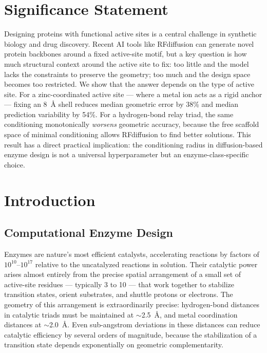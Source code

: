 \documentclass[11pt,letterpaper]{article}
\begin{document}
\section*{Significance Statement}
\begin{mdframed}
Designing proteins with functional active sites is a central challenge in synthetic biology and drug discovery. Recent AI tools like RFdiffusion can generate novel protein backbones around a fixed active-site motif, but a key question is how much structural context around the active site to fix: too little and the model lacks the constraints to preserve the geometry; too much and the design space becomes too restricted. We show that the answer depends on the type of active site. For a zinc-coordinated active site — where a metal ion acts as a rigid anchor — fixing an 8~\AA{} shell reduces median geometric error by 38\% and median prediction variability by 54\%. For a hydrogen-bond relay triad, the same conditioning monotonically \emph{worsens} geometric accuracy, because the free scaffold space of minimal conditioning allows RFdiffusion to find better solutions. This result has a direct practical implication: the conditioning radius in diffusion-based enzyme design is not a universal hyperparameter but an enzyme-class-specific choice.
\end{mdframed}

\section{Introduction}

\subsection{Computational Enzyme Design}

Enzymes are nature's most efficient catalysts, accelerating reactions by factors of $10^{10}$--$10^{17}$ relative to the uncatalyzed reactions in solution. Their catalytic power arises almost entirely from the precise spatial arrangement of a small set of active-site residues — typically 3 to 10 — that work together to stabilize transition states, orient substrates, and shuttle protons or electrons. The geometry of this arrangement is extraordinarily precise: hydrogen-bond distances in catalytic triads must be maintained at $\sim$2.5~\AA{}, and metal coordination distances at $\sim$2.0~\AA{}. Even sub-angstrom deviations in these distances can reduce catalytic efficiency by several orders of magnitude, because the stabilization of a transition state depends exponentially on geometric complementarity.
\end{document}

